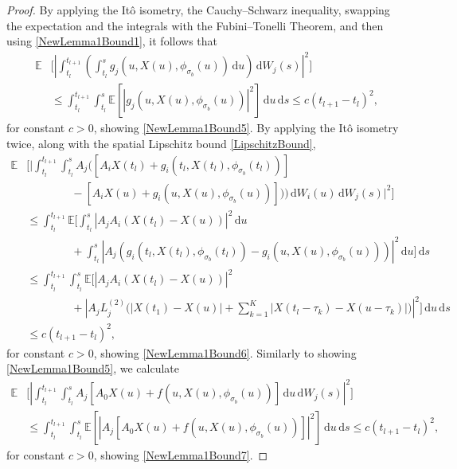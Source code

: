 \documentclass[onefignum]{siamart250211}
\providecommand{\abs}[1]{\left|#1\right|}
\begin{document}
\begin{proof}
By applying the It\^o isometry, the Cauchy--Schwarz inequality, swapping the expectation and the integrals with the Fubini--Tonelli Theorem, and then using \cref{NewLemma1Bound1}, it follows that
\begin{align*}
\mathbb{E}&\bigg[\abs{\int_{t_l}^{t_{l+1}}\left(\int_{t_l}^sg_j(u,X(u),\phi_{\sigma_b}(u))\,\mathrm{d}u\right)\,\mathrm{d}W_j(s)}^2\bigg]\\
&\leqslant\int_{t_l}^{t_{l+1}}\int_{t_l}^s\mathbb{E}\left[\abs{g_j(u,X(u),\phi_{\sigma_b}(u))}^2\right]\,\mathrm{d}u\,\mathrm{d}s\leqslant c(t_{l+1}-t_l)^2,
\end{align*}
for constant $c>0$, showing \cref{NewLemma1Bound5}. By applying the It\^o isometry twice, along with the spatial Lipschitz bound \cref{LipschitzBound},
\begin{align*}
\mathbb{E}&\bigg[\bigg|\int_{t_l}^{t_{l+1}}\int_{t_l}^sA_j\big([A_iX(t_l)+g_i(t_l,X(t_l),\phi_{\sigma_b}(t_l))]\\
&\quad\quad\quad\quad-[A_iX(u)+g_i(u,X(u),\phi_{\sigma_b}(u))]\big))\,\mathrm{d}W_i(u)\,\mathrm{d}W_j(s)\bigg|^2\bigg]\\
&\leqslant\int_{t_l}^{t_{l+1}}\mathbb{E}\bigg[\int_{t_l}^s\abs{A_jA_i(X(t_l)-X(u))}^2\,\mathrm{d}u\\
&\quad\quad\quad\quad+\int_{t_l}^s\abs{A_j(g_i(t_l,X(t_l),\phi_{\sigma_b}(t_l))-g_i(u,X(u),\phi_{\sigma_b}(u)))}^2\,\mathrm{d}u\bigg]\,\mathrm{d}s\\
&\leqslant\int_{t_l}^{t_{l+1}}\int_{t_l}^s\mathbb{E}\bigg[\abs{A_jA_i(X(t_l)-X(u))}^2\\
&\quad\quad\quad\quad+\abs{A_jL_j^{(2)}\bigg(\abs{X(t_1)-X(u)}+\sum_{k=1}^K\abs{X(t_l-{\tau_k})-X(u-{\tau_k})}\bigg)}^2\bigg]\,\mathrm{d}u\,\mathrm{d}s\\
&\leqslant c(t_{l+1}-t_l)^2,
\end{align*}
for constant $c>0$, showing \cref{NewLemma1Bound6}. Similarly to showing \cref{NewLemma1Bound5}, we calculate
\begin{align*}
\mathbb{E}&\bigg[\abs{\int_{t_l}^{t_{l+1}}\int_{t_l}^sA_j[A_0X(u)+f(u,X(u),\phi_{\sigma_b}(u))]\,\mathrm{d}u\,\mathrm{d}W_j(s)}^2\bigg]\\
&\leqslant\int_{t_l}^{t_{l+1}}\int_{t_l}^s\mathbb{E}\left[\abs{A_j[A_0X(u)+f(u,X(u),\phi_{\sigma_b}(u))]}^2\right]\,\mathrm{d}u\,\mathrm{d}s\leqslant c(t_{l+1}-t_l)^2,
\end{align*}
for constant $c>0$, showing \cref{NewLemma1Bound7}.
\end{proof}
\end{document}
